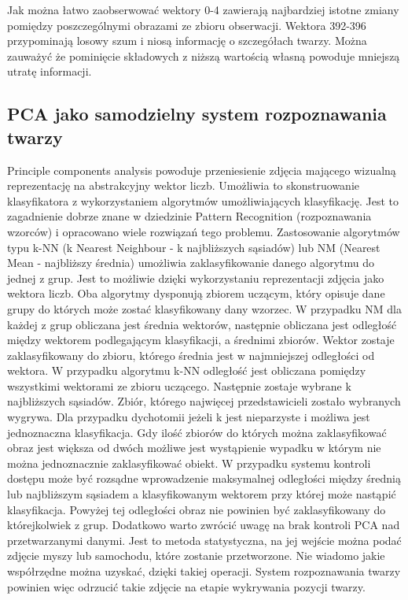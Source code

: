 \documentclass[oneside, eng]{mgr}
\begin{document}
Jak można łatwo zaobserwować wektory 0-4 zawierają najbardziej istotne zmiany pomiędzy poszczególnymi obrazami ze zbioru obserwacji. Wektora 392-396 przypominają losowy szum i niosą informację o szczegółach twarzy. Można zauważyć że pominięcie składowych z niższą wartością własną powoduje mniejszą utratę informacji.

\subsection{PCA jako samodzielny system rozpoznawania twarzy}
Principle components analysis powoduje przeniesienie zdjęcia mającego wizualną reprezentację na abstrakcyjny wektor liczb. Umożliwia to skonstruowanie klasyfikatora z wykorzystaniem algorytmów umożliwiających klasyfikację. Jest to zagadnienie dobrze znane w dziedzinie Pattern Recognition (rozpoznawania wzorców) i opracowano wiele rozwiązań tego problemu. Zastosowanie algorytmów typu k-NN (k Nearest Neighbour - k najbliższych sąsiadów) lub NM (Nearest Mean - najbliższy średnia) umożliwia zaklasyfikowanie danego algorytmu do jednej z grup. Jest to możliwie dzięki wykorzystaniu reprezentacji zdjęcia jako wektora liczb. Oba algorytmy dysponują zbiorem uczącym, który opisuje dane grupy do których może zostać klasyfikowany dany wzorzec. 
W przypadku NM dla każdej z grup obliczana jest średnia wektorów, następnie obliczana jest odległość między wektorem podlegającym klasyfikacji, a średnimi zbiorów. Wektor zostaje zaklasyfikowany do zbioru, którego średnia jest w najmniejszej odległości od wektora. 
W przypadku algorytmu k-NN odległość jest obliczana pomiędzy wszystkimi wektorami ze zbioru uczącego. Następnie zostaje wybrane k najbliższych sąsiadów. Zbiór, którego najwięcej przedstawicieli zostało wybranych wygrywa. Dla przypadku dychotomii jeżeli k jest nieparzyste i możliwa jest jednoznaczna klasyfikacja. Gdy ilość zbiorów do których można zaklasyfikować obraz jest większa od dwóch możliwe jest wystąpienie wypadku w którym nie można jednoznacznie zaklasyfikować obiekt. 
W przypadku systemu kontroli dostępu może być rozsądne wprowadzenie maksymalnej odległości między średnią lub najbliższym sąsiadem a klasyfikowanym wektorem przy której może nastąpić klasyfikacja. Powyżej tej odległości obraz nie powinien być zaklasyfikowany do którejkolwiek z grup. 
Dodatkowo warto zwrócić uwagę na brak kontroli PCA nad przetwarzanymi danymi. Jest to metoda statystyczna, na jej wejście można podać zdjęcie myszy lub samochodu, które zostanie przetworzone. Nie wiadomo jakie współrzędne można uzyskać, dzięki takiej operacji. System rozpoznawania twarzy powinien więc odrzucić takie zdjęcie na etapie wykrywania pozycji twarzy.
\end{document}
